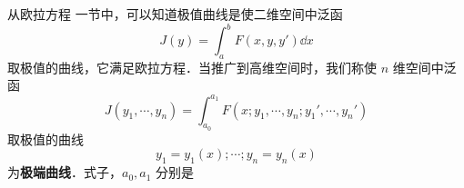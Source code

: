 

从欧拉方程 一节中，可以知道极值曲线是使二维空间中泛函 
\begin{equation}
J(y)=\int_a^b F(x,y,y')\dd x
\end{equation}
取极值的曲线，它满足欧拉方程．当推广到高维空间时，我们称使 $n$ 维空间中泛函 
\begin{equation}
J(y_1,\cdots, y_n)=\int_{a_0}^{a_1}F(x;y_1,\cdots,y_n;y_1',\cdots,y_n') 
\end{equation}
取极值的曲线 
\begin{equation}
y_1=y_1(x);\cdots;y_n=y_n(x)
\end{equation}
为\textbf{极端曲线}．式子，$a_0,a_1$ 分别是 